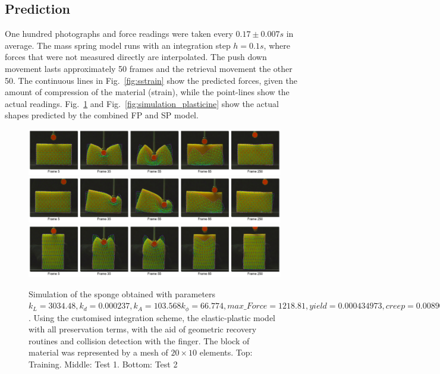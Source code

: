 \documentclass[journal]{IEEEtran}
\newcommand{\fref}[1]{Fig.~\ref{#1}}
\begin{document}
\subsection{Prediction}

One hundred photographs and force readings were taken every $0.17\pm0.007 s$ in average.  The mass spring model runs with an integration step $h=0.1s$, where forces that were not measured directly are interpolated.  The push down movement lasts approximately 50 frames and the retrieval movement the other 50.  The continuous lines in \fref{fig:sstrain} show the predicted forces, given the amount of compression of the material (strain), while the point-lines show the actual readings.  \fref{fig:simulation_sponge} and \fref{fig:simulation_plasticine} show the actual shapes predicted by the combined FP and SP model.

\begin{figure}[!t]
\centering
\includegraphics[width=178mm]{arrio9}
\includegraphics[width=178mm]{arrio10}
\includegraphics[width=178mm]{arrio11}
\caption{Simulation of the sponge obtained with parameters $k_L=3034.48, k_d=0.000237, k_A=103.568 k_{\phi}=66.774, max\_Force=1218.81, yield=0.000434973, creep=0.00890343, max\_\alpha=0.45204$.  Using the customised integration scheme, the elastic-plastic model with all preservation terms, with the aid of geometric recovery routines and collision detection with the finger.  The block of material was represented by a mesh of $20 \times 10$ elements. Top: Training. Middle: Test 1. Bottom: Test 2}\label{fig:simulation_sponge}
\end{figure}
\end{document}

